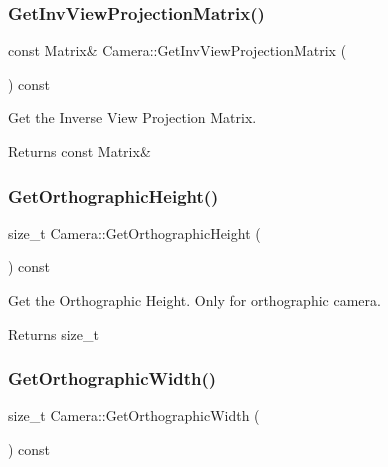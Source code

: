 \subsubsection{\texorpdfstring{Get\+Inv\+View\+Projection\+Matrix()}{GetInvViewProjectionMatrix()}}
{\footnotesize\ttfamily const Matrix\& Camera\+::\+Get\+Inv\+View\+Projection\+Matrix (\begin{DoxyParamCaption}{ }\end{DoxyParamCaption}) const\hspace{0.3cm}{\ttfamily [inline]}}



Get the Inverse View Projection Matrix. 

\begin{DoxyReturn}{Returns}
const Matrix\& 
\end{DoxyReturn}
\mbox{\label{classCamera_a12110e195967b52900768e4e008c7d63}} 
\subsubsection{\texorpdfstring{Get\+Orthographic\+Height()}{GetOrthographicHeight()}}
{\footnotesize\ttfamily size\+\_\+t Camera\+::\+Get\+Orthographic\+Height (\begin{DoxyParamCaption}{ }\end{DoxyParamCaption}) const}



Get the Orthographic Height. Only for orthographic camera. 

\begin{DoxyReturn}{Returns}
size\+\_\+t 
\end{DoxyReturn}
\mbox{\label{classCamera_a247797f293fc7e2aa7529c3ad0ea4739}} 
\subsubsection{\texorpdfstring{Get\+Orthographic\+Width()}{GetOrthographicWidth()}}
{\footnotesize\ttfamily size\+\_\+t Camera\+::\+Get\+Orthographic\+Width (\begin{DoxyParamCaption}{ }\end{DoxyParamCaption}) const}



